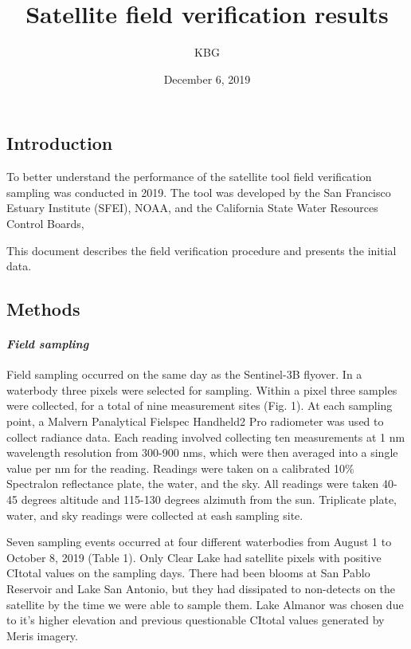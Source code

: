 \documentclass[]{article}
\title{Satellite field verification results}
\author{KBG}
\date{December 6, 2019}
\let\oldparagraph\paragraph
\renewcommand{\paragraph}[1]{\oldparagraph{#1}\mbox{}}
\begin{document}
\maketitle

\hypertarget{introduction}{%
\subsection{\texorpdfstring{\textbf{Introduction}}{Introduction}}\label{introduction}}

To better understand the performance of the satellite tool field
verification sampling was conducted in 2019. The tool was developed by
the San Francisco Estuary Institute (SFEI), NOAA, and the California
State Water Resources Control Boards,

This document describes the field verification procedure and presents
the initial data.

\hypertarget{methods}{%
\subsection{\texorpdfstring{\textbf{Methods}}{Methods}}\label{methods}}

\hypertarget{field-sampling}{%
\paragraph{\texorpdfstring{\emph{Field
sampling}}{Field sampling}}\label{field-sampling}}

Field sampling occurred on the same day as the Sentinel-3B flyover. In a
waterbody three pixels were selected for sampling. Within a pixel three
samples were collected, for a total of nine measurement sites (Fig. 1).
At each sampling point, a Malvern Panalytical Fielspec Handheld2 Pro
radiometer was used to collect radiance data. Each reading involved
collecting ten measurements at 1 nm wavelength resolution from 300-900
nms, which were then averaged into a single value per nm for the
reading. Readings were taken on a calibrated 10\% Spectralon reflectance
plate, the water, and the sky. All readings were taken 40-45 degrees
altitude and 115-130 degrees alzimuth from the sun. Triplicate plate,
water, and sky readings were collected at eash sampling site.

Seven sampling events occurred at four different waterbodies from August
1 to October 8, 2019 (Table 1). Only Clear Lake had satellite pixels
with positive CItotal values on the sampling days. There had been blooms
at San Pablo Reservoir and Lake San Antonio, but they had dissipated to
non-detects on the satellite by the time we were able to sample them.
Lake Almanor was chosen due to it's higher elevation and previous
questionable CItotal values generated by Meris imagery.
\end{document}
